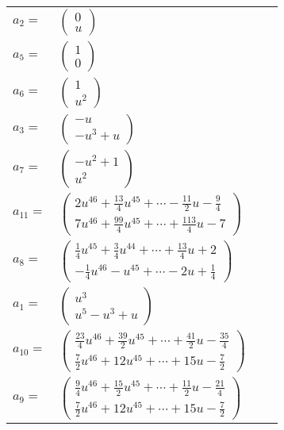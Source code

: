 \documentclass[1p]{elsarticle_modified}
\theoremstyle{definition}
\begin{document}
\begin{tabular}{m{7pt} m{180pt} m{7pt} m{180pt} }
\flushright $a_{2}=$&$\begin{pmatrix}0\\u\end{pmatrix}$ \\
\flushright $a_{5}=$&$\begin{pmatrix}1\\0\end{pmatrix}$ \\
\flushright $a_{6}=$&$\begin{pmatrix}1\\u^2\end{pmatrix}$ \\
\flushright $a_{3}=$&$\begin{pmatrix}- u\\- u^3+u\end{pmatrix}$ \\
\flushright $a_{7}=$&$\begin{pmatrix}- u^2+1\\u^2\end{pmatrix}$ \\
\flushright $a_{11}=$&$\begin{pmatrix}2 u^{46}+\frac{13}{4} u^{45}+\cdots-\frac{11}{2} u-\frac{9}{4}\\7 u^{46}+\frac{99}{4} u^{45}+\cdots+\frac{113}{4} u-7\end{pmatrix}$ \\
\flushright $a_{8}=$&$\begin{pmatrix}\frac{1}{4} u^{45}+\frac{3}{4} u^{44}+\cdots+\frac{13}{4} u+2\\-\frac{1}{4} u^{46}- u^{45}+\cdots-2 u+\frac{1}{4}\end{pmatrix}$ \\
\flushright $a_{1}=$&$\begin{pmatrix}u^3\\u^5- u^3+u\end{pmatrix}$ \\
\flushright $a_{10}=$&$\begin{pmatrix}\frac{23}{4} u^{46}+\frac{39}{2} u^{45}+\cdots+\frac{41}{2} u-\frac{35}{4}\\\frac{7}{2} u^{46}+12 u^{45}+\cdots+15 u-\frac{7}{2}\end{pmatrix}$ \\
\flushright $a_{9}=$&$\begin{pmatrix}\frac{9}{4} u^{46}+\frac{15}{2} u^{45}+\cdots+\frac{11}{2} u-\frac{21}{4}\\\frac{7}{2} u^{46}+12 u^{45}+\cdots+15 u-\frac{7}{2}\end{pmatrix}$ \\

\end{tabular}
\end{document}

